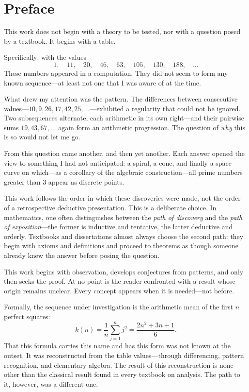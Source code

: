 \chapter*{Preface}

This work does not begin with a theory to be tested, nor with a question
posed by a textbook. It begins with a table.

Specifically: with the values
\[
1,\quad 11,\quad 20,\quad 46,\quad 63,\quad 105,\quad 130,\quad 188,\quad \ldots
\]
These numbers appeared in a computation. They did not seem to form any
known sequence---at least not one that I was aware of at the time.

What drew my attention was the pattern. The differences between consecutive
values---$10, 9, 26, 17, 42, 25, \ldots$---exhibited a regularity that
could not be ignored. Two subsequences alternate, each arithmetic in its
own right---and their pairwise sums $19, 43, 67, \ldots$ again form an
arithmetic progression. The question of \emph{why} this is so would not
let me go.

From this question came another, and then yet another. Each answer opened
the view to something I had not anticipated: a spiral, a cone, and finally
a space curve on which---as a corollary of the algebraic construction---all
prime numbers greater than $3$ appear as discrete points.

\medskip

This work follows the order in which these discoveries were made, not the
order of a retrospective deductive presentation. This is a deliberate choice.
In mathematics, one often distinguishes between the \emph{path of discovery}
and the \emph{path of exposition}---the former is inductive and tentative,
the latter deductive and orderly. Textbooks and dissertations almost always
choose the second path: they begin with axioms and definitions and proceed
to theorems as though someone already knew the answer before posing the
question.

This work begins with observation, develops conjectures from patterns, and
only then seeks the proof. At no point is the reader confronted with a result
whose origin remains unclear. Every concept appears when it is needed---not
before.

\medskip

Formally, the sequence under investigation is the arithmetic mean of the
first $n$ perfect squares:
\[
k(n) = \frac{1}{n}\sum_{j=1}^{n} j^2 = \frac{2n^2 + 3n + 1}{6}.
\]
That this formula carries this name and has this form was not known at the
outset. It was reconstructed from the table values---through differencing,
pattern recognition, and elementary algebra. The result of this reconstruction
is none other than the classical result found in every textbook on analysis.
The path to it, however, was a different one.

